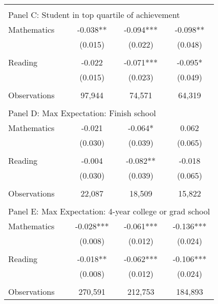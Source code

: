 {\begin{tabular}{lccc}
&  &  &   \\
\multicolumn{4}{l}{Panel C: Student in top quartile of achievement} \\
\hspace{3mm}Mathematics&      -0.038** &      -0.094***&      -0.098** \\
                    &     (0.015)   &     (0.022)   &     (0.048)   \\
 
&  &  &   \\
\hspace{3mm}Reading &      -0.022   &      -0.071***&      -0.095*  \\
                    &     (0.015)   &     (0.023)   &     (0.049)   \\
                    &               &               &               \\
\hspace{3mm}Observations&      97,944   &      74,571   &      64,319   \\
 
&  &  &   \\
\multicolumn{4}{l}{Panel D: Max Expectation: Finish school} \\
\hspace{3mm}Mathematics&      -0.021   &      -0.064*  &       0.062   \\
                    &     (0.030)   &     (0.039)   &     (0.065)   \\
 
&  &  &   \\
\hspace{3mm}Reading &      -0.004   &      -0.082** &      -0.018   \\
                    &     (0.030)   &     (0.039)   &     (0.065)   \\
                    &               &               &               \\
\hspace{3mm}Observations&      22,087   &      18,509   &      15,822   \\
 
&  &  &   \\
\multicolumn{4}{l}{Panel E: Max Expectation: 4-year college or grad school} \\
\hspace{3mm}Mathematics&      -0.028***&      -0.061***&      -0.136***\\
                    &     (0.008)   &     (0.012)   &     (0.024)   \\
 
&  &  &   \\
\hspace{3mm}Reading &      -0.018** &      -0.062***&      -0.106***\\
                    &     (0.008)   &     (0.012)   &     (0.024)   \\
                    &               &               &               \\
\hspace{3mm}Observations&     270,591   &     212,753   &     184,893   \\
 

\bottomrule
\end{tabular}
}
